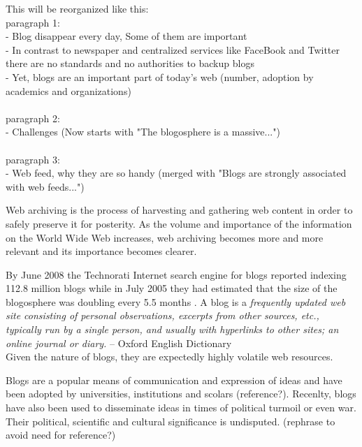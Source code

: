 This will be reorganized like this:\\
paragraph 1:\\
- Blog disappear every day, Some of them are important\\
- In contrast to newspaper and centralized services like FaceBook and Twitter there are no standards and no authorities to backup blogs\\
- Yet, blogs are an important part of today's web (number, adoption by academics and organizations)\\
\\
paragraph 2:\\
- Challenges (Now starts with "The blogosphere is a massive...")\\
\\
paragraph 3:\\
- Web feed, why they are so handy (merged with 
"Blogs are strongly associated with web feeds...")

Web archiving is the process of harvesting and gathering web content in order to safely preserve it for posterity. As the volume and importance of the information on the World Wide Web increases, web archiving becomes more and more relevant and its importance becomes clearer. 

By June 2008 the Technorati Internet search engine for blogs reported indexing 112.8 million blogs \cite{technoratidata2008} while in July 2005 they had estimated that the size of the blogosphere was doubling every 5.5 months \cite{bloggrowth2005}. A blog is a \emph{frequently updated web site consisting of personal observations, excerpts from other sources, etc., typically run by a single person, and usually with hyperlinks to other sites; an online journal or diary.} -- Oxford English Dictionary\\ Given the nature of blogs, they are expectedly highly volatile web resources.

Blogs are a popular means of communication and expression of ideas and have been adopted by universities, institutions and scolars (reference?). Recenlty, blogs have also been used to disseminate ideas in times of political turmoil or even war\cite{nahedeltantawy2012}. Their political, scientific and cultural significance is undisputed. (rephrase to avoid need for reference?)


